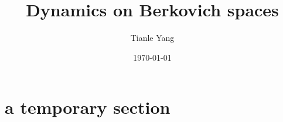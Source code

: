 \documentclass[sectionlevel=chapter,status=draft]{noteformyself}
\title{Dynamics on Berkovich spaces}
\author{Tianle Yang}
\date{\today}
\begin{document}
    \maketitle

    \tableofcontents

    \section[
      status=draft,
      tag=00000,
      label=\labelNFM{sec:dynamics-on-berkovich-spaces:a-theorem-for-attractor-of-endomorphism-on-k-affinoid-spaces}
    ]{a temporary section}
    


    \printbibliography[heading=bibintoc, title={References}]
\end{document}
